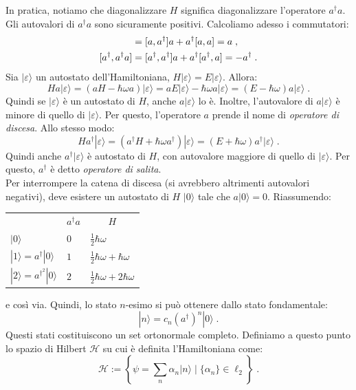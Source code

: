 \documentclass[10pt,a4paper]{report}
\theoremstyle{definition}
\newcommand{\ham}{\mathcal{H}}
\numberwithin{equation}{section}
\newcommand{\ket}{\rangle}
\newcommand{\adj}[1]{#1^{\dagger}}
\begin{document}
In pratica, notiamo che diagonalizzare $H$ significa diagonalizzare l'operatore $\adj{a}a$. Gli autovalori di $\adj{a}a$ sono sicuramente positivi. Calcoliamo adesso i commutatori:
\begin{align}
[a,\adj{a}a] &= [a,\adj{a}]a+\adj{a}[a,a]=a\;, \notag \\
[\adj{a},\adj{a}a] &= [\adj{a},\adj{a}]a+\adj{a}[\adj{a},a]=-\adj{a}\;.
\end{align}
Sia $|\varepsilon\ket$ un autostato dell'Hamiltoniana, $H|\varepsilon\ket=E|\varepsilon\ket$. Allora:
$$
Ha|\varepsilon\ket=(aH-\hbar\omega a)|\varepsilon\ket=aE|\varepsilon\ket-\hbar\omega a|\varepsilon\ket=(E-\hbar\omega)a|\varepsilon\ket\;.
$$
Quindi se $|\varepsilon\ket$ è un autostato di $H$, anche $a|\varepsilon\ket$ lo è. Inoltre, l'autovalore di $a|\varepsilon\ket$ è minore di quello di $|\varepsilon\ket$. Per questo, l'operatore $a$ prende il nome di \textit{operatore di discesa}. Allo stesso modo:
$$
H\adj{a}|\varepsilon\ket=(\adj{a}H+\hbar\omega\adj{a})|\varepsilon\ket=(E+\hbar\omega)\adj{a}|\varepsilon\ket\;.
$$
Quindi anche $\adj{a}|\varepsilon\ket$ è autostato di $H$, con autovalore maggiore di quello di $|\varepsilon\ket$. Per questo, $\adj{a}$ è detto \textit{operatore di salita}. \\
Per interrompere la catena di discesa (si avrebbero altrimenti autovalori negativi), deve esistere un autostato di $H$ $|0\ket$ tale che $a|0\ket=0$. Riassumendo:
\begin{table}[h]
\centering
\begin{tabular}{l l l}
\multicolumn{1}{c}{ } &
\multicolumn{1}{c}{$\adj{a}a$} &
\multicolumn{1}{c}{$H$} \\
$|0\ket$ & $0$ & $\frac{1}{2}\hbar\omega$ \\
$|1\ket=\adj{a}|0\ket$ & $1$ & $\frac{1}{2}\hbar\omega+\hbar\omega$ \\ 
$|2\ket=a^{\dagger^2}|0\ket$ & $2$ & $\frac{1}{2}\hbar\omega+2\hbar\omega$ \\
\end{tabular}
\end{table}
e così via. Quindi, lo stato $n$-esimo si può ottenere dallo stato fondamentale:
\begin{equation}
|n\ket=c_n(\adj{a})^n|0\ket\;.
\end{equation}
Questi stati costituiscono un set ortonormale completo. Definiamo a questo punto lo spazio di Hilbert $\ham$ su cui è definita l'Hamiltoniana come:
\begin{equation}
\ham:=\left\{\psi=\sum_n \alpha_n|n\ket\; |\;\{\alpha_n\}\in \ell_2\right\}\;.
\end{equation}
\end{document}
